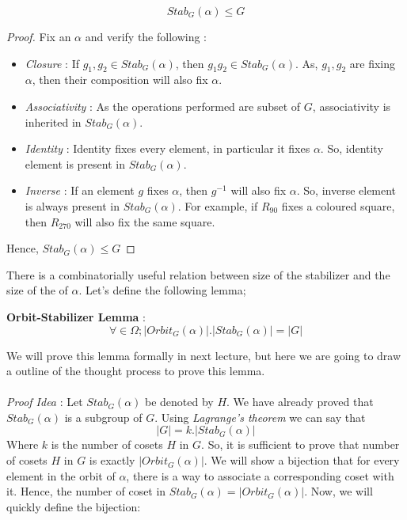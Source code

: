 {\begin{claim}
$$Stab_G(\alpha)\leq G$$
\end{claim}
\begin{proof}
Fix an $\alpha$ and verify the following :
\begin{itemize}
\item \emph{Closure} : If $g_1,g_2\in Stab_G(\alpha)$, then $g_1g_2\in Stab_G(\alpha)$. As, $g_1,g_2$ are fixing $\alpha$, then their composition will also fix $\alpha$.
\item \emph{Associativity} : As the operations performed are subset of $G$, associativity is inherited in $Stab_G(\alpha)$.
\item \emph{Identity} : Identity fixes every element, in particular it fixes $\alpha$. So, identity element is present in $Stab_G(\alpha)$.
\item \emph{Inverse} : If an element $g$ fixes $\alpha$, then $g^{-1}$ will also fix $\alpha$. So, inverse element is always present in $Stab_G(\alpha)$. For example,   if $R_{90}$ fixes a coloured square, then $R_{270}$ will also fix the same square.
\end{itemize}
Hence, $Stab_G(\alpha)\leq G$
\end{proof}
There is a combinatorially useful relation between size of the stabilizer and the size of the of $\alpha$. Let's define the following lemma;
\begin{lemma}
\textbf{Orbit-Stabilizer Lemma} : $$\forall\in \Omega;|Orbit_G(\alpha)|.|Stab_G(\alpha)|=|G|$$
\end{lemma}
We will prove this lemma formally in next lecture, but here we are going to draw a outline of the thought process to prove this lemma.
\paragraph{}
\emph{Proof Idea} : Let $Stab_G(\alpha)$ be denoted by $H$. We have already proved that $Stab_G(\alpha)$ is a subgroup of $G$. Using \emph{Lagrange's theorem} we can say that $$|G|=k.|Stab_G(\alpha)|$$
Where $k$ is the number of cosets $H$ in $G$. So, it is sufficient to prove that number of cosets $H$ in $G$ is exactly $|Orbit_G(\alpha)|$. We will show a bijection that for every element in the orbit of $\alpha$, there is a way to associate a corresponding coset with it. Hence, the number of coset in $Stab_G(\alpha) =|Orbit_G(\alpha)|$. Now, we will quickly define the bijection:
}
